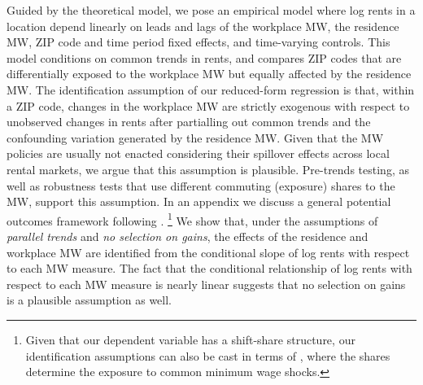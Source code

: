 Guided by the theoretical model, we pose an empirical model where log rents in 
a location depend linearly on
leads and lags of the workplace MW,
the residence MW,
ZIP code and time period fixed effects, and 
time-varying controls.
This model conditions on common trends in rents, and compares ZIP codes
that are differentially exposed to the workplace MW but equally affected by the 
residence MW.
The identification assumption of our reduced-form regression is that,
within a ZIP code, changes in the workplace MW are strictly exogenous with 
respect to unobserved changes in rents after partialling out common trends
and the confounding variation generated by the residence MW.
Given that the MW policies are usually not enacted considering their spillover
effects across local rental markets, we argue that this assumption is plausible.
Pre-trends testing, as well as robustness tests that use different commuting
(exposure) shares to the MW, support this assumption.
In an appendix we discuss a general potential outcomes framework following
\textcite{CallawayEtAl2021}.%
\footnote{Given that our dependent variable has a shift-share structure, our 
    identification assumptions can also be cast in terms of 
    \textcite{GoldsmithpinkhamEtAl2020}, where the shares determine the exposure
    to common minimum wage shocks.}
We show that, under the assumptions of \textit{parallel trends} and 
\textit{no selection on gains}, 
the effects of the residence and workplace MW are identified from the 
conditional slope of log rents with respect to each MW measure.
The fact that the conditional relationship of log rents with respect to each MW
measure is nearly linear suggests that no selection on gains is a plausible
assumption as well.


